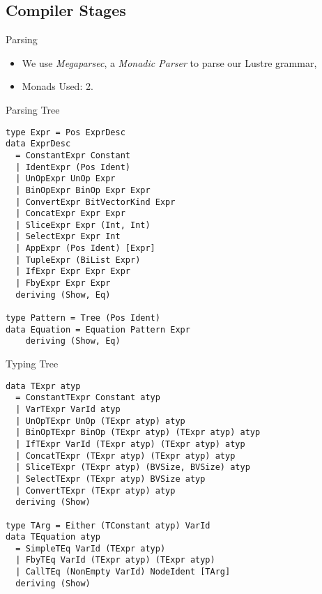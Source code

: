 \documentclass{beamer}
\begin{document}
\subsection{Compiler Stages}

\begin{frame}{Parsing}
    \begin{itemize}
        \setlength{\itemsep}{8pt}
        \item We use \emph{Megaparsec}, a \emph{Monadic Parser} to parse our Lustre grammar,
        \item Monads Used: 2.
    \end{itemize}
\end{frame}

\begin{frame}[fragile]{Parsing Tree}
    \begin{footnotesize}
        \begin{verbatim}
type Expr = Pos ExprDesc
data ExprDesc
  = ConstantExpr Constant
  | IdentExpr (Pos Ident)
  | UnOpExpr UnOp Expr
  | BinOpExpr BinOp Expr Expr
  | ConvertExpr BitVectorKind Expr
  | ConcatExpr Expr Expr
  | SliceExpr Expr (Int, Int)
  | SelectExpr Expr Int
  | AppExpr (Pos Ident) [Expr]
  | TupleExpr (BiList Expr)
  | IfExpr Expr Expr Expr
  | FbyExpr Expr Expr
  deriving (Show, Eq)

type Pattern = Tree (Pos Ident)
data Equation = Equation Pattern Expr
    deriving (Show, Eq)
        \end{verbatim}
    \end{footnotesize}
\end{frame}

\begin{frame}[fragile]{Typing Tree}
    \begin{footnotesize}
        \begin{verbatim}
data TExpr atyp
  = ConstantTExpr Constant atyp
  | VarTExpr VarId atyp
  | UnOpTExpr UnOp (TExpr atyp) atyp
  | BinOpTExpr BinOp (TExpr atyp) (TExpr atyp) atyp
  | IfTExpr VarId (TExpr atyp) (TExpr atyp) atyp
  | ConcatTExpr (TExpr atyp) (TExpr atyp) atyp
  | SliceTExpr (TExpr atyp) (BVSize, BVSize) atyp
  | SelectTExpr (TExpr atyp) BVSize atyp
  | ConvertTExpr (TExpr atyp) atyp
  deriving (Show)

type TArg = Either (TConstant atyp) VarId
data TEquation atyp
  = SimpleTEq VarId (TExpr atyp)
  | FbyTEq VarId (TExpr atyp) (TExpr atyp)
  | CallTEq (NonEmpty VarId) NodeIdent [TArg]
  deriving (Show)
        \end{verbatim}
    \end{footnotesize}
\end{frame}
\end{document}
